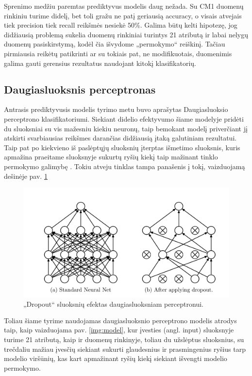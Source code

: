 \documentclass{VUMIFPSbakalaurinis}
\begin{document}
Sprenimo medžiu paremtas prediktyvus modelis daug nežada. Su CM1 duomenų rinkiniu turime didelį, bet toli gražu ne patį geriausią accuracy, o visais atvejais tiek precision tiek recall reikšmės nesiekė 50\%. Galima būtų kelti hipotezę, jog didžiausią problemą sukelia duomenų rinkiniai turintys 21 atributą ir labai nelygų duomenų pasiskirstymą, kodėl čia išvydome „permokymo“ reiškinį. Tačiau pirmiausia reikėtų patikrinti ar su tokiais pat, ne modifikuotais, duomenimis galima gauti gerensius rezultatus naudojant kitokį klasifikatorių.

\subsection{Daugiasluoksnis perceptronas}
Antrasis prediktyvusis modelis tyrimo metu buvo aprašytas Daugiasluoksio perceptrono klasifikatoriumi. Siekiant didelio efektyvumo šiame modelyje pridėti du sluoksniai su vis mažesniu kiekiu neuronų, taip bemokant modelį priverčiant jį atskirti svarbiausias reikšmes darančias didžiausią įtaką galutiniam rezultatui. Taip pat po kiekvieno iš paslėptųjų sluoksnių įterptas išmetimo sluoksnis, kuris apmažina praeitame sluoksnyje sukurtų ryšių kiekį taip mažinant tinklo permokymo galimybę \cite{JMLR:v15:srivastava14a}. Tokiu atveju tinklas tampa panašenis į tokį, vaizduojamą dešinėje pav. \ref{img:dropout}

\begin{figure}[H]
    \centering
    \includegraphics[scale=0.5]{img/dropout}
    \caption{„Dropout“ sluoksnių efektas daugiasluoksniam perceptronui.}
    \label{img:dropout}
\end{figure}

Toliau šiame tyrime naudojamas daugiasluoksnio perceptrono modelis atrodys taip, kaip vaizduojama pav. \ref{img:model}, kur įvesties (angl. input) sluoksnyje turime 21 atributą, kaip ir duomenų rinkinyje, toliau du užslėptus sluoksnius, su trečdaliu mažiau įvesčių siekiant sukurti glaudesnius ir prasmingenius ryšius tarp modelio viršūnių, kas kart apmažinant ryšių kiekį siekiant išvengti modelio permokymo.
\end{document}
